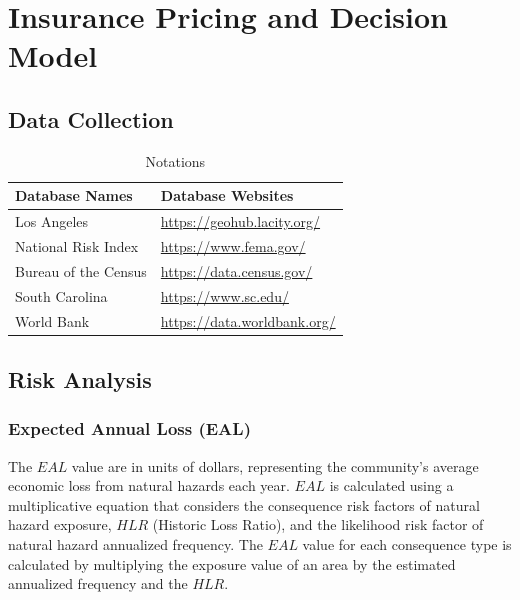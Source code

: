 \documentclass{mcmthesis}
\begin{document}
\section{Insurance Pricing and Decision Model}

\subsection{Data Collection}

\begin{table}[H]     %
\small
\centering           %
\caption{Notations}  %
\label{tbl2}         %
\begin{tabular}{ll}  %
\toprule             %
{\bf Database Names}     &  {\bf Database Websites}     \\
\midrule             %
Los Angeles              & \url{https://geohub.lacity.org/}  \\
National Risk Index      & \url{https://www.fema.gov/}  \\
Bureau of the Census     & \url{https://data.census.gov/}  \\
South Carolina           & \url{https://www.sc.edu/}  \\
World Bank               & \url{https://data.worldbank.org/}  \\
\bottomrule         %
\end{tabular}
\end{table}

% 
% 

\subsection{Risk Analysis}

\subsubsection{Expected Annual Loss (EAL)}

The $EAL$ value are in units of dollars, representing the community’s average economic
loss from natural hazards each year. $EAL$ is calculated using a multiplicative equation that
considers the consequence risk factors of natural hazard exposure, $HLR$ (Historic Loss Ratio),
and the likelihood risk factor of natural hazard annualized frequency. The $EAL$ value for each
consequence type is calculated by multiplying the exposure value of an area by the estimated
annualized frequency and the $HLR$.
\end{document}
